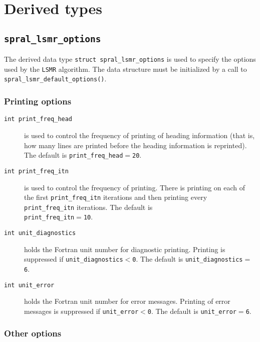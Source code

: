 
\section{Derived types}
\subsection{\texttt{spral\_lsmr\_options}}
\label{LSMR:type:options}

The derived data type {\tt struct spral\_lsmr\_options} is used to specify the
options used by the \texttt{LSMR} algorithm. The data structure must be
initialized by a call to \texttt{spral\_lsmr\_default\_options()}.

\subsubsection*{Printing options}

\begin{description}

\item[\texttt{int print\_freq\_head}]
is used to control the frequency of printing 
of heading information (that is, how many
lines are printed before the heading information is reprinted). 
The default is {\tt print\_freq\_head$=$\tt 20}.

\item[\texttt{int print\_freq\_itn}]
is used to control the frequency of printing.
There is printing on each of the first {\tt print\_freq\_itn} iterations 
and then printing  every {\tt print\_freq\_itn}
iterations.
The default is \\{\tt print\_freq\_itn$=$\tt 10}.



\item[\texttt{int unit\_diagnostics}] holds the Fortran
unit number for diagnostic printing. Printing is suppressed if
{\tt unit\_diagnostics$<$0}.
The default is {\tt unit\_diagnostics$=$6}.

\item[\texttt{int unit\_error}] holds the Fortran
unit number for error messages.
Printing of error messages
is suppressed if {\tt unit\_error$<$0}.
The default is {\tt unit\_error$=$6}.


\end{description}



\subsubsection*{Other options}

